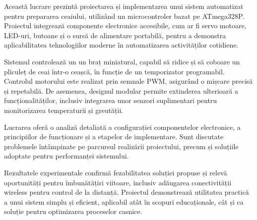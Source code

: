 

Această lucrare prezintă proiectarea și %
implementarea unui sistem automatizat pentru %
prepararea ceaiului, utilizând un %
microcontroler bazat pe ATmega328P. Proiectul %
integrează componente electronice accesibile, %
cum ar fi servo motoare, LED-uri, butoane %
și o sursă de alimentare portabilă, %
pentru a demonstra aplicabilitatea %
tehnologiilor moderne în automatizarea %
activităților cotidiene.  

Sistemul controlează un un braț miniatural, %
capabil să ridice %
și să coboare un pliculeț de ceai %
într-o ceașcă, în funcție de un %
temporizator programabil. Controlul motorului %
este realizat prin semnale PWM, asigurând %
o mișcare precisă și repetabilă. %
De asemenea, designul modular permite %
extinderea ulterioară a funcționalităților, %
inclusiv integrarea unor senzori %
suplimentari pentru monitorizarea %
temperaturii și greutății.  

Lucrarea oferă o analiză detaliată %
a configurației componentelor electronice, %
a principiilor de funcționare și a %
etapelor de implementare. Sunt discutate %
problemele întâmpinate pe parcursul %
realizării proiectului, precum și %
soluțiile adoptate pentru  %
performanței sistemului.  

Rezultatele experimentale confirmă %
fezabilitatea soluției propuse și relevă %
oportunități pentru îmbunătățiri viitoare, %
inclusiv adăugarea conectivității wireless %
pentru control de la distanță. Proiectul %
demonstrează utilitatea practică a unui %
sistem simplu și eficient, aplicabil %
atât în scopuri educaționale, cât și %
ca soluție pentru optimizarea %
proceselor casnice.  

